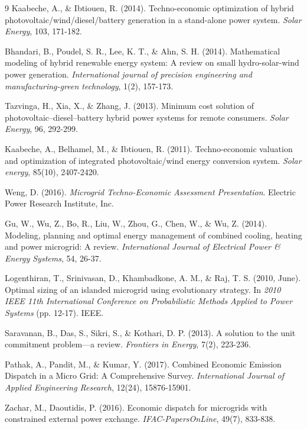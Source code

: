 \documentclass[final,3p,times]{elsarticle}
\begin{document}
\begin{thebibliography}{9}
Kaabeche, A., \& Ibtiouen, R. (2014). Techno-economic optimization of hybrid photovoltaic/wind/diesel/battery generation in a stand-alone power system. \textit{Solar Energy}, 103, 171-182.

Bhandari, B., Poudel, S. R., Lee, K. T., \& Ahn, S. H. (2014). Mathematical modeling of hybrid renewable energy system: A review on small hydro-solar-wind power generation. \textit{International journal of precision engineering and manufacturing-green technology}, 1(2), 157-173.

Tazvinga, H., Xia, X., \& Zhang, J. (2013). Minimum cost solution of photovoltaic–diesel–battery hybrid power systems for remote consumers. \textit{Solar Energy}, 96, 292-299.

Kaabeche, A., Belhamel, M., \& Ibtiouen, R. (2011). Techno-economic valuation and optimization of integrated photovoltaic/wind energy conversion system. \textit{Solar energy}, 85(10), 2407-2420.

Weng, D. (2016). \textit{Microgrid Techno-Economic Assessment Presentation}. Electric Power Research Institute, Inc.

Gu, W., Wu, Z., Bo, R., Liu, W., Zhou, G., Chen, W., \& Wu, Z. (2014). Modeling, planning and optimal energy management of combined cooling, heating and power microgrid: A review. \textit{International Journal of Electrical Power \& Energy Systems}, 54, 26-37.

Logenthiran, T., Srinivasan, D., Khambadkone, A. M., \& Raj, T. S. (2010, June). Optimal sizing of an islanded microgrid using evolutionary strategy. In \textit{2010 IEEE 11th International Conference on Probabilistic Methods Applied to Power Systems} (pp. 12-17). IEEE.

Saravanan, B., Das, S., Sikri, S., \& Kothari, D. P. (2013). A solution to the unit commitment problem—a review. \textit{Frontiers in Energy}, 7(2), 223-236.

Pathak, A., Pandit, M., \& Kumar, Y. (2017). Combined Economic Emission Dispatch in a Micro Grid: A Comprehensive Survey. \textit{International Journal of Applied Engineering Research}, 12(24), 15876-15901.

Zachar, M., Daoutidis, P. (2016). Economic dispatch for microgrids with constrained external power exchange. \textit{IFAC-PapersOnLine}, 49(7), 833-838.


\end{thebibliography}
\end{document}
